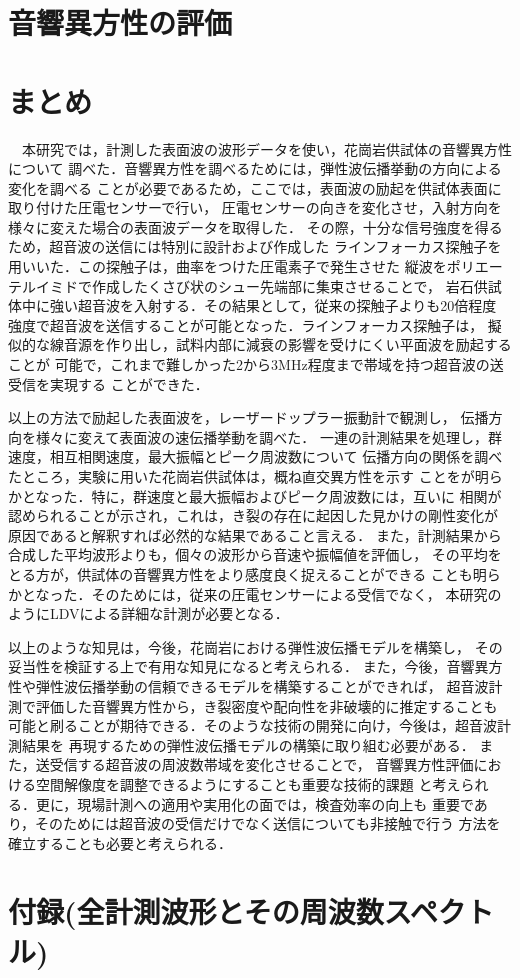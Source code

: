 ﻿\documentclass[11pt,a4j]{jarticle}
\begin{document}
\section{音響異方性の評価}

\newpage
\section{まとめ}
　本研究では，計測した表面波の波形データを使い，花崗岩供試体の音響異方性について
調べた．音響異方性を調べるためには，弾性波伝播挙動の方向による変化を調べる
ことが必要であるため，ここでは，表面波の励起を供試体表面に取り付けた圧電センサーで行い，
圧電センサーの向きを変化させ，入射方向を様々に変えた場合の表面波データを取得した．
その際，十分な信号強度を得るため，超音波の送信には特別に設計および作成した
ラインフォーカス探触子を用いいた．この探触子は，曲率をつけた圧電素子で発生させた
縦波をポリエーテルイミドで作成したくさび状のシュー先端部に集束させることで，
岩石供試体中に強い超音波を入射する．その結果として，従来の探触子よりも20倍程度
強度で超音波を送信することが可能となった．ラインフォーカス探触子は，
擬似的な線音源を作り出し，試料内部に減衰の影響を受けにくい平面波を励起することが
可能で，これまで難しかった2から3MHz程度まで帯域を持つ超音波の送受信を実現する
ことができた．

以上の方法で励起した表面波を，レーザードップラー振動計で観測し，
伝播方向を様々に変えて表面波の速伝播挙動を調べた．
一連の計測結果を処理し，群速度，相互相関速度，最大振幅とピーク周波数について
伝播方向の関係を調べたところ，実験に用いた花崗岩供試体は，概ね直交異方性を示す
ことをが明らかとなった．特に，群速度と最大振幅およびピーク周波数には，互いに
相関が認められることが示され，これは，き裂の存在に起因した見かけの剛性変化が
原因であると解釈すれば必然的な結果であること言える．
また，計測結果から合成した平均波形よりも，個々の波形から音速や振幅値を評価し，
その平均をとる方が，供試体の音響異方性をより感度良く捉えることができる
ことも明らかとなった．そのためには，従来の圧電センサーによる受信でなく，
本研究のようにLDVによる詳細な計測が必要となる．

以上のような知見は，今後，花崗岩における弾性波伝播モデルを構築し，
その妥当性を検証する上で有用な知見になると考えられる．
また，今後，音響異方性や弾性波伝播挙動の信頼できるモデルを構築することができれば，
超音波計測で評価した音響異方性から，き裂密度や配向性を非破壊的に推定することも
可能と刷ることが期待できる．そのような技術の開発に向け，今後は，超音波計測結果を
再現するための弾性波伝播モデルの構築に取り組む必要がある．
また，送受信する超音波の周波数帯域を変化させることで，
音響異方性評価における空間解像度を調整できるようにすることも重要な技術的課題
と考えられる．更に，現場計測への適用や実用化の面では，検査効率の向上も
重要であり，そのためには超音波の受信だけでなく送信についても非接触で行う
方法を確立することも必要と考えられる．
\section{付録(全計測波形とその周波数スペクトル)}

\end{document}
